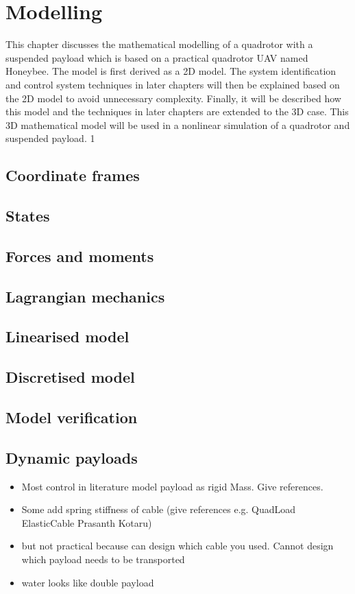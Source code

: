 \graphicspath{{modelling/fig/}}

\chapter{Modelling}
\label{chap:modelling}

This chapter discusses the mathematical modelling of a quadrotor with a suspended
payload which is based on a practical quadrotor UAV named Honeybee.
The model is first derived as a 2D model.
The system identification and control system techniques in later chapters will then be explained based on the 2D model to avoid unnecessary complexity.
Finally, it will be described how this model and the techniques in later chapters are extended to the 3D case.
This 3D mathematical model will be used in a nonlinear simulation of a quadrotor and suspended payload.
1
\section{Coordinate frames}
\section{States}
\section{Forces and moments}
\section{Lagrangian mechanics}
\section{Linearised model}
    \label{sec:linear_model}

\section{Discretised model}
\section{Model verification}
\section{Dynamic payloads}
\begin{itemize}
    \item Most control in literature model payload as rigid Mass. Give references.
    \item Some add spring stiffness of cable (give references e.g. QuadLoad ElasticCable Prasanth Kotaru)
    \item but not practical because can design which cable you used. Cannot design which payload needs to be transported
    \item water looks like double payload
\end{itemize}



